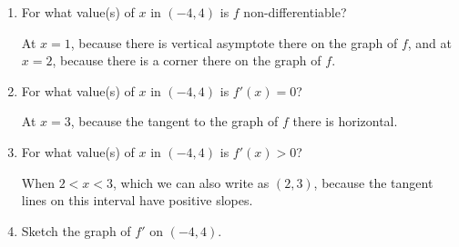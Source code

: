 \documentclass{article}
\begin{document}
\begin{enumerate}[resume]
  \begin{enumerate}
  \item


    \begin{problem}[\vfill]
      For what value(s) of $x$ in $(-4, 4)$ is $f$ non-differentiable? 
    \end{problem}

    \begin{solution}
      At $x=1$, because there is vertical asymptote there on the graph of $f$, and at $x=2$, because
      there is a corner there on the graph of $f$.
    \end{solution}

  \item
    \begin{problem}[\vfill]
      For what value(s) of $x$ in $(-4, 4)$ is $f'(x) = 0$?
    \end{problem}

    \begin{solution}
      At $x=3$, because the tangent to the graph of $f$ there is horizontal.
    \end{solution}

  \item
    \begin{problem}[\vfill]
      For what value(s) of $x$ in $(-4, 4)$ is $f'(x) > 0$?
    \end{problem}

    \begin{solution}
      When $2 < x < 3$, which we can also write as $(2, 3)$, because the tangent lines on this interval have positive slopes.
    \end{solution}

  \item
    \begin{problem}[\nstretch{6}]
      Sketch the graph of $f'$ on $(-4, 4)$. 
    \end{problem}


\end{enumerate}
\end{enumerate}
\end{document}
